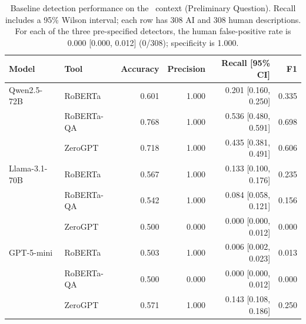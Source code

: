\begin{table}[t]
\centering
\caption{Baseline detection performance on the \FileDiff~context (Preliminary Question). Recall includes a 95\% Wilson interval; each row has 308 AI and 308 human descriptions. For each of the three pre-specified detectors, the human false-positive rate is 0.000 [0.000, 0.012] (0/308); specificity is 1.000.}
\label{tab:prelim_rq_results}
\footnotesize
\setlength{\tabcolsep}{5pt}
\begin{tabular}{llrrrr}
\toprule
\textbf{Model} & \textbf{Tool} & \textbf{Accuracy} & \textbf{Precision} & \textbf{Recall [95\% CI]} & \textbf{F1} \\
\midrule
Qwen2.5-72B & RoBERTa & 0.601 & 1.000 & 0.201 [0.160, 0.250] & 0.335 \\
 & RoBERTa-QA & 0.768 & 1.000 & 0.536 [0.480, 0.591] & 0.698 \\
 & ZeroGPT & 0.718 & 1.000 & 0.435 [0.381, 0.491] & 0.606 \\
\midrule
Llama-3.1-70B & RoBERTa & 0.567 & 1.000 & 0.133 [0.100, 0.176] & 0.235 \\
 & RoBERTa-QA & 0.542 & 1.000 & 0.084 [0.058, 0.121] & 0.156 \\
 & ZeroGPT & 0.500 & 0.000 & 0.000 [0.000, 0.012] & 0.000 \\
\midrule
GPT-5-mini & RoBERTa & 0.503 & 1.000 & 0.006 [0.002, 0.023] & 0.013 \\
 & RoBERTa-QA & 0.500 & 0.000 & 0.000 [0.000, 0.012] & 0.000 \\
 & ZeroGPT & 0.571 & 1.000 & 0.143 [0.108, 0.186] & 0.250 \\
\bottomrule
\end{tabular}
\end{table}
